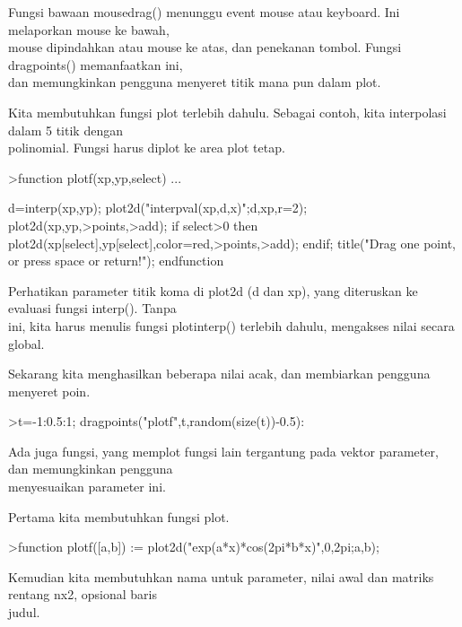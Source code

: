 \documentclass[a4paper,10pt]{article}
\begin{document}
\begin{eulernotebook}
\begin{eulercomment}
\begin{eulercomment}
\begin{eulercomment}
\begin{eulercomment}
\begin{eulercomment}
\begin{eulercomment}
\begin{eulercomment}
Fungsi bawaan mousedrag() menunggu event mouse atau keyboard. Ini
melaporkan mouse ke bawah,\\
mouse dipindahkan atau mouse ke atas, dan penekanan tombol. Fungsi
dragpoints() memanfaatkan ini,\\
dan memungkinkan pengguna menyeret titik mana pun dalam plot.

Kita membutuhkan fungsi plot terlebih dahulu. Sebagai contoh, kita
interpolasi dalam 5 titik dengan\\
polinomial. Fungsi harus diplot ke area plot tetap.
\end{eulercomment}
\begin{eulerprompt}
>function plotf(xp,yp,select) ...
\end{eulerprompt}
\begin{eulerudf}
    d=interp(xp,yp);
    plot2d("interpval(xp,d,x)";d,xp,r=2);
    plot2d(xp,yp,>points,>add);
    if select>0 then
      plot2d(xp[select],yp[select],color=red,>points,>add);
    endif;
    title("Drag one point, or press space or return!");
  endfunction
\end{eulerudf}
\begin{eulercomment}
Perhatikan parameter titik koma di plot2d (d dan xp), yang diteruskan
ke evaluasi fungsi interp(). Tanpa\\
ini, kita harus menulis fungsi plotinterp() terlebih dahulu, mengakses
nilai secara global.

Sekarang kita menghasilkan beberapa nilai acak, dan membiarkan
pengguna menyeret poin.
\end{eulercomment}
\begin{eulerprompt}
>t=-1:0.5:1; dragpoints("plotf",t,random(size(t))-0.5):
\end{eulerprompt}
\begin{eulercomment}
Ada juga fungsi, yang memplot fungsi lain tergantung pada vektor
parameter, dan memungkinkan pengguna\\
menyesuaikan parameter ini.

Pertama kita membutuhkan fungsi plot.
\end{eulercomment}
\begin{eulerprompt}
>function plotf([a,b]) := plot2d("exp(a*x)*cos(2pi*b*x)",0,2pi;a,b);
\end{eulerprompt}
\begin{eulercomment}
Kemudian kita membutuhkan nama untuk parameter, nilai awal dan matriks
rentang nx2, opsional baris\\
judul.


\end{eulercomment}
\end{eulercomment}
\end{eulercomment}
\end{eulercomment}
\end{eulercomment}
\end{eulercomment}
\end{eulercomment}
\end{eulernotebook}
\end{document}
